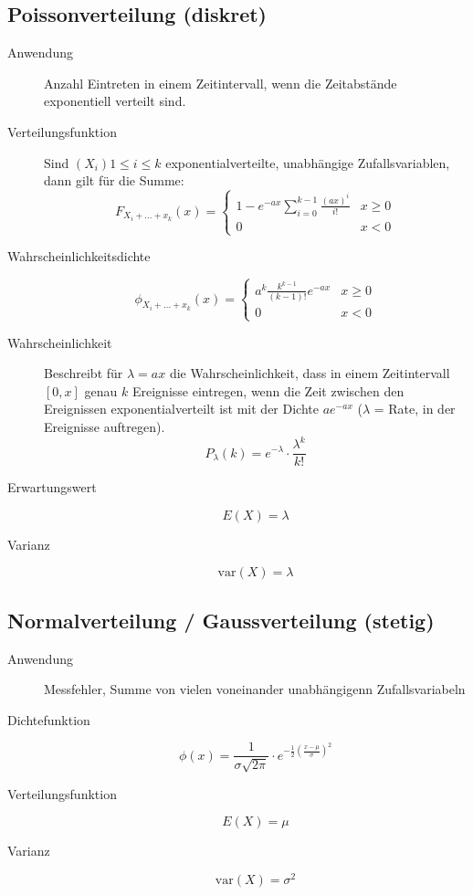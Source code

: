 \subsection{Poissonverteilung (diskret)}
\begin{description}
  \item[Anwendung] Anzahl Eintreten in einem Zeitintervall, wenn die
    Zeitabstände exponentiell verteilt sind.
  \item[Verteilungsfunktion] Sind $(X_i)1 \leq i \leq k$
  exponentialverteilte, unabhängige Zufallsvariablen, dann gilt für die
  Summe:
  \[F_{X_i+\dots+x_k}(x) = \begin{cases}1 - e^{-ax} \sum_{i=0}^{k-1}
  \frac{(ax)^i}{i!} & x \geq 0 \\ 0 & x < 0\end{cases}\]
  \item[Wahrscheinlichkeitsdichte]
  \[\phi_{X_i+\dots+x_k}(x) = \begin{cases}a^k \frac{k^{k-1}}{(k-1)!}
  e^{-ax} & x \geq 0 \\ 0 & x < 0\end{cases}\]
  \item[Wahrscheinlichkeit] Beschreibt für $\lambda = ax$ die
    Wahrscheinlichkeit, dass in einem Zeitintervall $[0, x]$ genau $k$
    Ereignisse eintregen, wenn die Zeit zwischen den Ereignissen
    exponentialverteilt ist mit der Dichte $ae^{-ax}$ ($\lambda$ = Rate,
    in der Ereignisse auftregen).
    \[P_\lambda(k) = e^{-\lambda} \cdot \frac{\lambda^k}{k!}\]
  \item[Erwartungswert] \[E(X) = \lambda\]
  \item[Varianz] \[\text{var}(X) = \lambda\]
\end{description}

\subsection{Normalverteilung / Gaussverteilung (stetig)}
\begin{description}
  \item[Anwendung] Messfehler, Summe von vielen voneinander
  unabhängigenn Zufallsvariabeln
  \item[Dichtefunktion] \[\phi(x) = \frac{1}{\sigma \sqrt{2\pi}} \cdot
    e^{-\frac{1}{2}{\left(\frac{x-\mu}{\sigma}\right)}^2}\]
  \item[Verteilungsfunktion] \[E(X) = \mu\]
  \item[Varianz] \[\text{var}(X) = \sigma^2\]
\end{description}

